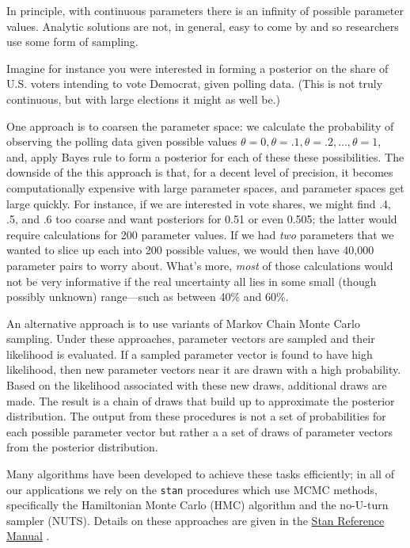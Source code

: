 \documentclass[
  12pt,
]{book}
\begin{document}
In principle, with continuous parameters there is an infinity of possible parameter values. Analytic solutions are not, in general, easy to come by and so researchers use some form of sampling.

Imagine for instance you were interested in forming a posterior on the share of U.S. voters intending to vote Democrat, given polling data. (This is not truly continuous, but with large elections it might as well be.)

One approach is to coarsen the parameter space: we calculate the probability of observing the polling data given possible values \(\theta = 0, \theta = .1, \theta = .2, \dots, \theta = 1\), and, apply Bayes rule to form a posterior for each of these these possibilities. The downside of the this approach is that, for a decent level of precision, it becomes computationally expensive with large parameter spaces, and parameter spaces get large quickly. For instance, if we are interested in vote shares, we might find .4, .5, and .6 too coarse and want posteriors for 0.51 or even 0.505; the latter would require calculations for 200 parameter values. If we had \emph{two} parameters that we wanted to slice up each into 200 possible values, we would then have 40,000 parameter pairs to worry about. What's more, \emph{most} of those calculations would not be very informative if the real uncertainty all lies in some small (though possibly unknown) range---such as between 40\% and 60\%.

An alternative approach is to use variants of Markov Chain Monte Carlo sampling. Under these approaches, parameter vectors are sampled and their likelihood is evaluated. If a sampled parameter vector is found to have high likelihood, then new parameter vectors near it are drawn with a high probability. Based on the likelihood associated with these new draws, additional draws are made. The result is a chain of draws that build up to approximate the posterior distribution. The output from these procedures is not a set of probabilities for each possible parameter vector but rather a a set of draws of parameter vectors from the posterior distribution.

Many algorithms have been developed to achieve these tasks efficiently; in all of our applications we rely on the \texttt{stan} procedures which use MCMC methods, specifically the Hamiltonian Monte Carlo (HMC) algorithm and the no-U-turn sampler (NUTS). Details on these approaches are given in the \href{https://mc-stan.org/docs/2_18/reference-manual/hmc-chapter.html}{Stan Reference Manual} \citep{stan2020stan}.
\end{document}
